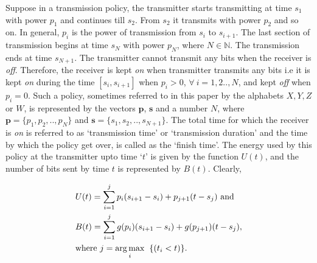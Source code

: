 Suppose in a transmission policy, the transmitter starts transmitting at time $s_1$ with power $p_1$ and continues till $s_2$. From $s_2$ it transmits with power $p_2$ and so on. In general, $p_i$ is the power of transmission from $s_i$ to $s_{i+1}$. The last section of transmission begins at time $s_N$ with power $p_N$, where $N\in \mathbb{N}$. The transmission ends at time $s_{N+1}$. The transmitter cannot transmit any bits when the receiver is \textit{off}. Therefore, the receiver is kept \textit{on} when transmitter transmits any bits i.e it is kept \textit{on} during the time $[s_i,s_{i+1}]$ when $p_i > 0$, $\forall \ i=1,2..,N$, and kept \textit{off} when $p_i=0$. Such a policy, sometimes referred to in this paper by the alphabets $X,Y,Z$ or $W$, is represented by the vectors $\bm{p}$, $\bm{s}$ and a number $N$, where $\bm{p}=\{p_1, p_2, .., p_N\}$ and $\bm{s}=\{s_1, s_2, .., s_{N+1}\}$. The total time for which the receiver is \textit{on} is referred to as `transmission time' or `transmission duration' and the time by which the policy get over, is called as the `finish time'. The energy used by this policy at the transmitter upto time `$t$' is given by the function $U(t)$, and the number of bits sent by time $t$ is represented by $B(t)$. Clearly,

\begin{align}
&U(t)=\sum_{i=1}^{j} p_i(s_{i+1}-s_i)+p_{j+1}(t-s_j) \text{ and }
\\
&B(t)=\sum_{i=1}^{j} g(p_i)(s_{i+1}-s_i)+g(p_{j+1})(t-s_j),
\\
&\text{where }j=\argmax_{i} \hspace{2mm}\{(t_i<t)\}.\nonumber
\end{align}

